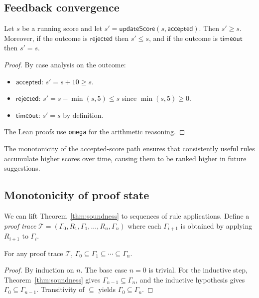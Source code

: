 \documentclass[11pt]{article}
\begin{document}
\subsection{Feedback convergence}\label{ssec:feedback-formal}

\begin{theorem}\label{thm:feedback}
  Let $s$ be a running score and let $s' = \mathsf{updateScore}(s,
  \mathsf{accepted})$.  Then $s' \geq s$.  Moreover, if the
  outcome is $\mathsf{rejected}$ then $s' \leq s$, and if the
  outcome is $\mathsf{timeout}$ then $s' = s$.
\end{theorem}

\begin{proof}
  By case analysis on the outcome:
  \begin{itemize}
    \item $\mathsf{accepted}$: $s' = s + 10 \geq s$.
    \item $\mathsf{rejected}$: $s' = s - \min(s, 5) \leq s$
      since $\min(s, 5) \geq 0$.
    \item $\mathsf{timeout}$: $s' = s$ by definition.
  \end{itemize}
  The Lean proofs use \texttt{omega} for the arithmetic reasoning.
\end{proof}

\noindent
The monotonicity of the accepted-score path ensures that
consistently useful rules accumulate higher scores over time,
causing them to be ranked higher in future suggestions.

\subsection{Monotonicity of proof state}\label{ssec:monotonicity}

We can lift Theorem~\ref{thm:soundness} to sequences of rule
applications.  Define a \emph{proof trace}
$\mathcal{T} = (\Gamma_0, R_1, \Gamma_1, \ldots, R_n, \Gamma_n)$
where each $\Gamma_{i+1}$ is obtained by applying $R_{i+1}$ to
$\Gamma_i$.

\begin{lemma}\label{lem:monotone}
  For any proof trace $\mathcal{T}$,
  $\Gamma_0 \subseteq \Gamma_1 \subseteq \cdots \subseteq
  \Gamma_n$.
\end{lemma}

\begin{proof}
  By induction on $n$.  The base case $n = 0$ is trivial.  For
  the inductive step, Theorem~\ref{thm:soundness} gives
  $\Gamma_{n-1} \subseteq \Gamma_n$, and the inductive hypothesis
  gives $\Gamma_0 \subseteq \Gamma_{n-1}$.  Transitivity of
  $\subseteq$ yields $\Gamma_0 \subseteq \Gamma_n$.
\end{proof}
\end{document}

